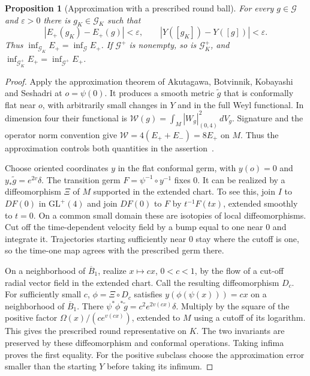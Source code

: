 \documentclass[11pt]{article}
\numberwithin{equation}{section}
\newtheorem{proposition}[theorem]{Proposition}
\theoremstyle{definition}
\theoremstyle{remark}
\begin{document}
\begin{proposition}[Approximation with a prescribed round ball]\label{var:marking}
For every \(g\in\mathcal G\) and \(\varepsilon>0\) there is
\(g_K\in\mathcal G_K\) such that
\[
 |E_+(g_K)-E_+(g)|<\varepsilon,\qquad
 |Y([g_K])-Y([g])|<\varepsilon .
\]
Thus \(\inf_{\mathcal G_K}E_+=\inf_{\mathcal G}E_+\). If
\(\mathcal G^+\) is nonempty, so is \(\mathcal G_K^+\), and
\(\inf_{\mathcal G_K^+}E_+=\inf_{\mathcal G^+}E_+\).
\end{proposition}

\begin{proof}
Apply the approximation theorem of Akutagawa, Botvinnik, Kobayashi
and Seshadri at \(o=\psi(0)\). It produces a smooth metric \(\widetilde g\)
that is conformally flat near \(o\), with arbitrarily small changes
in \(Y\) and in the full Weyl functional. In dimension four their
functional is \(\mathcal W(g)=\int_M|W_g|_{(0,4)}^2\,dV_g\).
Signature and the operator norm convention give
\(\mathcal W=4(E_++E_-)=8E_+\) on \(M\). Thus the approximation
controls both quantities in the assertion~\cite[\S1.2 and Proposition 4.1]{AkutagawaEtAl2002Weyl}.

Choose oriented coordinates \(y\) in the flat conformal germ,
with \(y(o)=0\) and \(y_*\widetilde g=e^{2v}\delta\). The transition
germ \(F=\psi^{-1}\circ y^{-1}\) fixes \(0\). It can be realized by
a diffeomorphism \(\Xi\) of \(M\) supported in the extended chart.
To see this, join \(I\) to \(DF(0)\) in \(\mathrm{GL}^+(4)\) and
join \(DF(0)\) to \(F\) by \(t^{-1}F(tx)\), extended smoothly to
\(t=0\). On a common small domain these are isotopies of local
diffeomorphisms. Cut off the time-dependent velocity field by a
bump equal to one near \(0\) and integrate it. Trajectories starting
sufficiently near \(0\) stay where the cutoff is one, so the time-one
map agrees with the prescribed germ there.

On a neighborhood of \(\overline B_1\), realize \(x\mapsto cx\),
\(0<c<1\), by the flow of a cut-off radial vector field in the
extended chart. Call the resulting diffeomorphism \(D_c\).
For sufficiently small \(c\), \(\phi=\Xi\circ D_c\) satisfies
\(y(\phi(\psi(x)))=cx\) on a neighborhood of \(\overline B_1\).
There \(\psi^*\phi^*\widetilde g=c^2e^{2v(cx)}\delta\).
Multiply by the square of the positive factor
\(\Omega(x)/(c e^{v(cx)})\), extended to \(M\) using a cutoff
of its logarithm. This gives the prescribed round representative
on \(K\). The two invariants are preserved by these diffeomorphism
and conformal operations. Taking infima proves the first equality.
For the positive subclass choose the approximation error smaller
than the starting \(Y\) before taking its infimum.
\end{proof}
\end{document}

